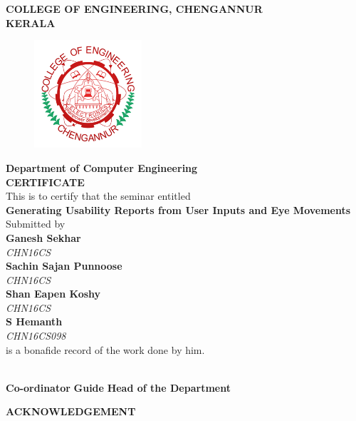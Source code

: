 \documentclass[a4paper,12pt,oneside]{article}
\begin{document}
\newpage
\thispagestyle{empty}
\begin{center}
\setlength{\baselineskip}{1.5\baselineskip}
{\large\textbf{COLLEGE OF ENGINEERING, CHENGANNUR}}
\\
{\large\textbf{KERALA}}
\\
\begin{figure}[H]
\centering
\includegraphics[width=4cm]{ceclogo.png}
\end{figure}
\setlength{\baselineskip}{1.5\baselineskip}
\textbf{Department of Computer Engineering}
\\
\textbf{CERTIFICATE}
\\
This is to certify that the seminar entitled
\\
\textbf{Generating Usability Reports from User Inputs and Eye Movements}
\\
Submitted by
\\
\textbf{Ganesh Sekhar}
\\
\vspace*{-5mm}
{\normalsize\textit{CHN16CS}}
\\
\textbf{Sachin Sajan Punnoose}
\\
\vspace*{-5mm}
{\normalsize\textit{CHN16CS}}
\\
\textbf{Shan Eapen Koshy}
\\
\vspace*{-5mm}
{\normalsize\textit{CHN16CS}}
\\
\textbf{S Hemanth}
\\
\vspace*{-5mm}
{\normalsize\textit{CHN16CS098}}
\\
is a bonafide record of the work done by him.
\end{center}
\vspace{18ex}
\hspace{5ex}
\hspace{15ex}
\hspace{16ex}
\\
\vspace{0ex}
\hspace{4ex}
\textbf{Co-ordinator}
\hspace{20ex}
\textbf{Guide}
\hspace{16ex}
\textbf{Head of the Department} 
\newpage
{}
\renewcommand{\headrulewidth}{0.0pt}
\renewcommand{\footrulewidth}{0.0pt}
\begin{center}
\large{\textbf{ACKNOWLEDGEMENT}}
\end{center}
\vspace{6ex}
\setlength{\baselineskip}{1.5\baselineskip}
\end{document}
